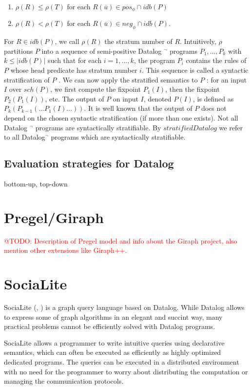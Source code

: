 \documentclass{pracamgr}
\makeatletter
\theoremstyle{plain}
\theoremstyle{definition}
\theoremstyle{remark}
\newcommand{\todo}[1]{\textcolor{red}{@TODO: #1}}
\makeatother
\begin{document}
\begin{enumerate}
\item $\rho(R) \le \rho(T )$ for each $R(\overline{u}) \in pos_\phi \cap idb(P)$
\item $\rho(R) < \rho(T )$ for each $R(\overline{u}) \in neg_\phi \cap idb(P )$.
\end{enumerate}
 For $R \in idb(P )$, we call $\rho(R)$ the stratum number of $R$. Intuitively, $\rho$ partitions $P$ into
a sequence of semi-positive Datalog $^\neg$ programs $P_1 , . . . , P_k$
with $k \le |idb(P )|$ such that for each $i = 1, \dots , k$, the program $P_i$ contains the rules of $P$ whose head predicate has
stratum number $i$. This sequence is called a syntactic stratification of $P$ . We can now apply the stratified semantics to
$P$ : for an input $I$ over $sch(P )$, we first compute the fixpoint
$P_1 (I)$, then the fixpoint $P_2 (P_1 (I))$, etc. The output of $P$ on
input $I$, denoted $P (I)$, is defined as $P_k (P_{k-1} (\dots P_1 (I) \dots))$.
It is well known that the output of $P$ does not depend on
the chosen syntactic stratification (if more than one exists).
Not all Datalog $^\neg$ programs are syntactically stratifiable. By
$stratified Datalog$ we refer to all Datalog$^\neg$ programs which
are syntactically stratifiable.

\section{Evaluation strategies for Datalog}
bottom-up, top-down

\chapter{Pregel/Giraph}\label{r:pregel}
\todo{Description of Pregel model and info about the Giraph project, also mention other extensions like Giraph++.}

\chapter{SociaLite}\label{r:socialite}

SociaLite (\cite{socialite}, \cite{distsoc}) is a graph query language based on Datalog. While Datalog allows to express some of graph algorithms
in an elegant and succint way, many practical problems cannot be efficiently solved with Datalog programs. 

SociaLite allows a programmer to write intuitive queries using declarative semantics, which can often be executed as efficiently as highly optimized dedicated programs. The queries can be executed in a distributed environment with no need for the programmer to worry about distributing the computation or managing the communication protocols.
\end{document}
